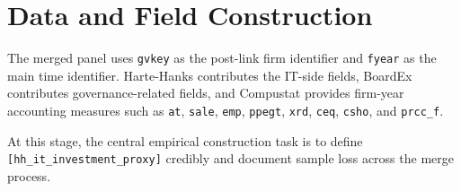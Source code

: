 \section{Data and Field Construction}

The merged panel uses \texttt{gvkey} as the post-link firm identifier and \texttt{fyear} as the main time identifier. Harte-Hanks contributes the IT-side fields, BoardEx contributes governance-related fields, and Compustat provides firm-year accounting measures such as \texttt{at}, \texttt{sale}, \texttt{emp}, \texttt{ppegt}, \texttt{xrd}, \texttt{ceq}, \texttt{csho}, and \texttt{prcc\_f}.

At this stage, the central empirical construction task is to define \texttt{[hh\_it\_investment\_proxy]} credibly and document sample loss across the merge process.
